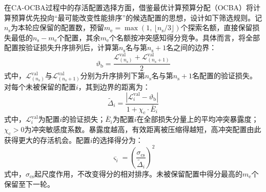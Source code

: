 在CA-OCBA过程中的存活配置选择方面，借鉴最优计算预算分配（OCBA）将计算预算优先投向``最可能改变性能排序''的候选配置的思想\cite{chenStochasticSimulationOptimization2011}，设计如下筛选规则。记$n_{\mathrm{s}}$为本轮应保留的配置数，预留$m_{\mathrm{e}} = \max\left(1,\, \lfloor n_{\mathrm{s}} / 3 \rfloor\right)$个探索名额，直接保留损失最低的$n_{\mathrm{s}} - m_{\mathrm{e}}$个配置，其余$m_{\mathrm{e}}$个名额按冲突感知得分竞争。具体而言，将全部配置按验证损失升序排列后，计算第$n_{\mathrm{s}}$名与第$n_{\mathrm{s}}+1$名之间的边界：
\begin{equation}
  \vartheta_{\mathrm{b}} = \frac{\mathcal{L}_{(n_{\mathrm{s}})}^{\mathrm{val}} + \mathcal{L}_{(n_{\mathrm{s}}+1)}^{\mathrm{val}}}{2}
  \label{eq.popsyn.selboundary}
\end{equation}
式中，$\mathcal{L}_{(n_{\mathrm{s}})}^{\mathrm{val}}$与$\mathcal{L}_{(n_{\mathrm{s}}+1)}^{\mathrm{val}}$分别为升序排列下第$n_{\mathrm{s}}$名与第$n_{\mathrm{s}}+1$名配置的验证损失。对每个未被保留的配置$i$，其到边界的距离为：
\begin{equation}
  \tilde{\Delta}_{i} = \frac{\left|\mathcal{L}_{i}^{\mathrm{val}} - \vartheta_{\mathrm{b}}\right|}{1 + \chi_{\mathrm{c}} \cdot \bar{E}_{i}}
  \label{eq.popsyn.adjdist}
\end{equation}
式中，$\mathcal{L}_{i}^{\mathrm{val}}$为配置$i$的验证损失；$\bar{E}_{i}$为配置$i$在全部损失分量上的平均冲突暴露度；$\chi_{\mathrm{c}} > 0$为冲突敏感度系数。暴露度越高，有效距离被压缩得越短，高冲突配置由此获得更大的存活机会。配置$i$的选择得分为：
\begin{equation}
  \varsigma_{i} = \left(\frac{\sigma_{\mathrm{cs}}}{\tilde{\Delta}_{i}}\right)^{2}
  \label{eq.popsyn.selscore}
\end{equation}
式中，$\sigma_{\mathrm{cs}}$起尺度作用，不改变得分的相对排序。未被保留配置中得分最高的$m_{\mathrm{e}}$个保留至下一轮。
 
